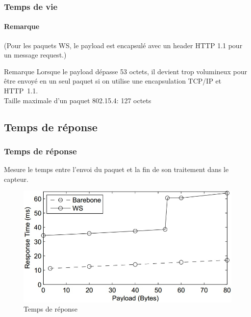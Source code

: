 \begin{frame}
 \frametitle{Temps de vie}
 \framesubtitle{Remarque}
 (Pour les paquets WS, le payload est encapsulé avec un header HTTP 1.1 pour un message request.)\\
 \vspace{3mm}
 \begin{block}{Remarque}
  Lorsque le payload dépasse 53 octets, il devient trop volumineux pour être envoyé en un seul paquet si on utilise une encapsulation TCP/IP et HTTP~1.1.\\
  \alert{Taille maximale d'un paquet 802.15.4: 127 octets}
 \end{block}
\end{frame}


\subsection{Temps de réponse}
\begin{frame}
 \frametitle{Temps de réponse}
 Mesure le temps entre l'envoi du paquet et la fin de son traitement dans le capteur.
 \begin{figure}
  \centering
  \includegraphics[scale=0.35]{figures/treponse.jpg}
  \caption{Temps de réponse}
 \end{figure} 
\end{frame}
 
